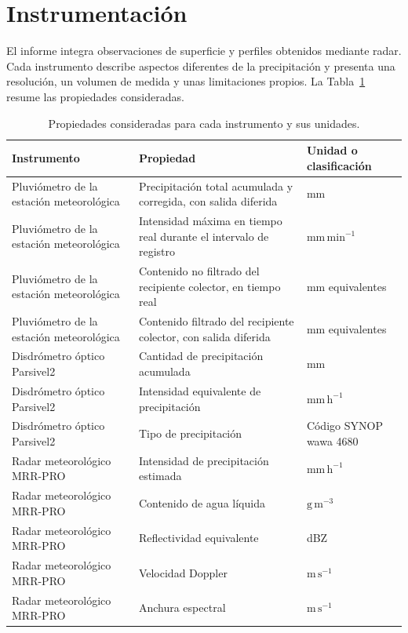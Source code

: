 \section{Instrumentación}
\label{sec:instrumentacion}

El informe integra observaciones de superficie y perfiles obtenidos mediante
radar. Cada instrumento describe aspectos diferentes de la precipitación y
presenta una resolución, un volumen de medida y unas limitaciones propios. La
Tabla~\ref{tab:instrumentacion} resume las propiedades consideradas.

\begin{table}[htbp]
  \centering
  \caption{Propiedades consideradas para cada instrumento y sus unidades.}
  \label{tab:instrumentacion}
  \small
  \begin{tabularx}{\textwidth}{@{}>{\raggedright\arraybackslash}p{}
                                  >{\raggedright\arraybackslash}X
                                  >{\raggedright\arraybackslash}p{}@{}}
    \toprule
    Instrumento & Propiedad & Unidad o clasificación \\
    \midrule
    Pluviómetro de la estación meteorológica
      & Precipitación total acumulada y corregida, con salida diferida
      & mm \\
    Pluviómetro de la estación meteorológica
      & Intensidad máxima en tiempo real durante el intervalo de registro
      & $\mathrm{mm\,min^{-1}}$ \\
    Pluviómetro de la estación meteorológica
      & Contenido no filtrado del recipiente colector, en tiempo real
      & mm equivalentes \\
    Pluviómetro de la estación meteorológica
      & Contenido filtrado del recipiente colector, con salida diferida
      & mm equivalentes \\
    Disdrómetro óptico Parsivel2
      & Cantidad de precipitación acumulada & mm \\
    Disdrómetro óptico Parsivel2
      & Intensidad equivalente de precipitación & $\mathrm{mm\,h^{-1}}$ \\
    Disdrómetro óptico Parsivel2
      & Tipo de precipitación & Código SYNOP wawa 4680 \\
    Radar meteorológico MRR-PRO
      & Intensidad de precipitación estimada & $\mathrm{mm\,h^{-1}}$ \\
    Radar meteorológico MRR-PRO
      & Contenido de agua líquida & $\mathrm{g\,m^{-3}}$ \\
    Radar meteorológico MRR-PRO
      & Reflectividad equivalente & dBZ \\
    Radar meteorológico MRR-PRO
      & Velocidad Doppler & $\mathrm{m\,s^{-1}}$ \\
    Radar meteorológico MRR-PRO
      & Anchura espectral & $\mathrm{m\,s^{-1}}$ \\
    \bottomrule
  \end{tabularx}
\end{table}